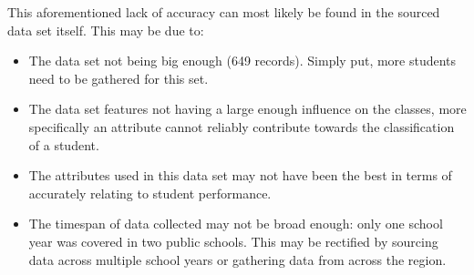 This aforementioned lack of accuracy can most likely be found in the sourced data set itself. This may be due to:
    \begin{itemize}
        \item The data set not being big enough (649 records). Simply put, more students need to be gathered for this set.
        \item The data set features not having a large enough influence on the classes, more specifically an attribute cannot reliably contribute towards the classification of a student.
        \item The attributes used in this data set may not have been the best in terms of accurately relating to student performance.
        \item The timespan of data collected may not be broad enough: only one school year was covered in two public schools. This may be rectified by sourcing data across multiple school years or gathering data from across the region.
    \end{itemize}  
